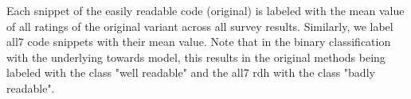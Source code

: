 \documentclass[%
class=scrreprt,
chapterprefix=false,%
open=right,%
twoside=false,%
paper=a4,%
logofile={Logo\_zentral\_farbig\_EN.png},%
thesistype=master,%
UKenglish,%
]{se2thesis}
\newcounter{urlfootnote}
\newcommand{\onecurl}[2]{%
	\stepcounter{urlfootnote}%
	\expandafter\def\csname urlfootnote:#1\endcsname{\theurlfootnote}%
	\footnote{\label{url:#1}\url{#1}, accessed: #2}%
}
\newcommand{\curl}[2]{%
	\ifcsdef{urlfootnote:#1}{%
		\textsuperscript{\ref{url:#1}}%
	}{%
		\onecurl{#1}{#2}%
	}%
}
\theoremstyle{definition}
\begin{document}
	Each snippet of the easily readable code (original) is labeled with the mean value of all ratings of the original variant across all survey results. Similarly, we label all7 code snippets with their mean value. Note that in the binary classification with the underlying towards model, this results in the original methods being labeled with the class "well readable" and the all7 rdh with the class "badly readable".
	
	
%	
%	
%	
%	
\end{document}
